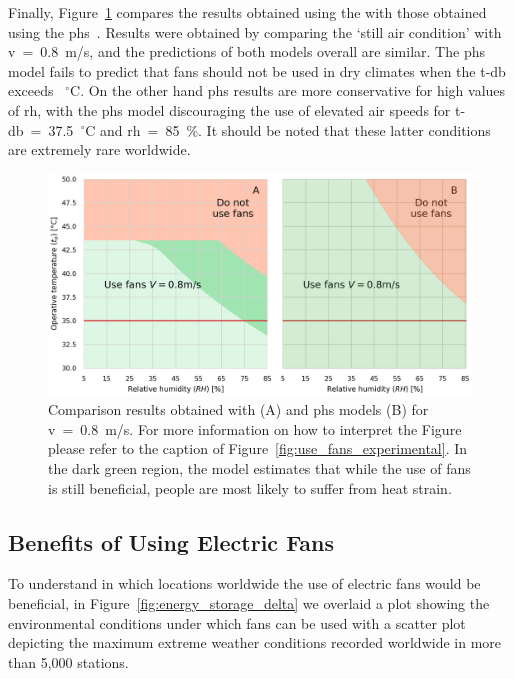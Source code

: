 Finally, Figure~\ref{fig:gagge_phs} compares the results obtained using the  with those obtained using the \ac{phs}~\cite{iso7933}.
Results were obtained by comparing the `still air condition' with \ac{v}~=~0.8~m/s, and the predictions of both models overall are similar.
The \ac{phs} model fails to predict that fans should not be used in dry climates when the \ac{t-db} exceeds ~$^{\circ}$C\@.
On the other hand \ac{phs} results are more conservative for high values of \ac{rh}, with the \ac{phs} model discouraging the use of elevated air speeds for \ac{t-db}~=~37.5~$^{\circ}$C and \ac{rh}~=~85~\%\@.
It should be noted that these latter conditions are extremely rare worldwide.

\begin{figure}[hbt!]
    \centering
    \includegraphics[width=\textwidth]{figures/phs_gagge}
    \caption{Comparison results obtained with  (A) and \ac{phs} models (B) for \ac{v}~=~0.8~m/s.
    For more information on how to interpret the Figure please refer to the caption of Figure~\ref{fig:use_fans_experimental}.
    In the dark green region, the  model estimates that while the use of fans is still beneficial, people are most likely to suffer from heat strain.}
    \label{fig:gagge_phs}
\end{figure}

\subsection{Benefits of Using Electric Fans}\label{subsec:use-fans}

To understand in which locations worldwide the use of electric fans would be beneficial, in Figure~\ref{fig:energy_storage_delta} we overlaid a plot showing the environmental conditions under which fans can be used with a scatter plot depicting the maximum extreme weather conditions recorded worldwide in more than 5,000 stations.

